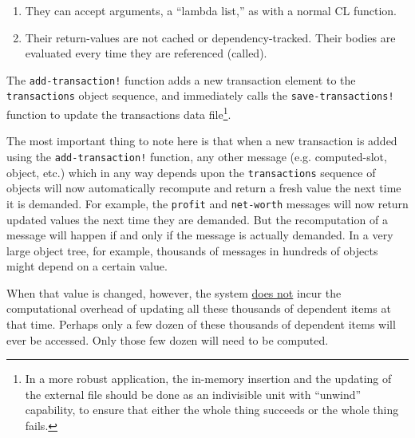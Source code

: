 \documentclass [11pt]{book}
\begin{document}
\begin{enumerate}

\item They can accept arguments, a ``lambda list,'' as with a normal CL function.

\item Their return-values are not cached or dependency-tracked. Their bodies are 
evaluated every time they are referenced (called).

\end{enumerate}

The \texttt{add-transaction!} function adds a new transaction element to the \texttt{transactions} object sequence, and immediately calls the \texttt{save-transactions!} function to update the transactions data file\footnote{In a more robust application, the in-memory insertion and
the updating of the external file should be done as an indivisible unit 
with ``unwind'' capability, to ensure that either the whole thing succeeds 
or the whole thing fails.}. 

The most important thing to note here is that when a new transaction is added
using the \texttt{add-transaction!} function, any other message (e.g. computed-slot, object, etc.) which in any
way depends upon the \texttt{transactions} sequence of objects will now automatically recompute and return a fresh
value the next time it is demanded. For example, the \texttt{profit} and \texttt{net-worth} messages will now return updated values the next time they are demanded.
But the recomputation of a message will happen if and only if the message is
actually demanded. In a very large object tree, for example, thousands of messages
in hundreds of objects might depend on a certain value. 

When that value is 
changed, however, the system 
\underline{does not} incur the computational overhead of 
updating all these thousands of dependent items at that time. Perhaps only a 
few dozen of these thousands of dependent items will ever be accessed. Only 
those few dozen will need to be computed.
\end{document}
